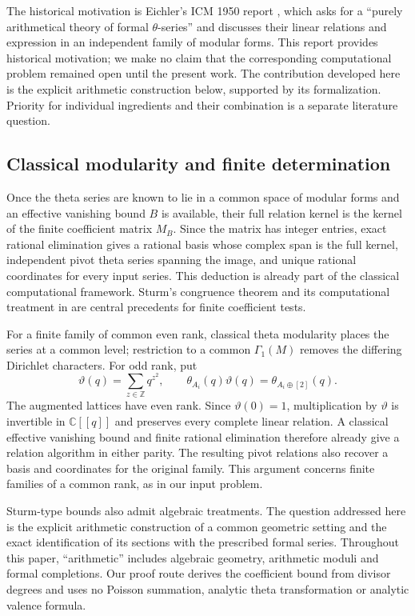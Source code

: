 \documentclass[11pt]{article}
\theoremstyle{remark}\newtheorem{remark}[theorem]{Remark}
\newcommand{\Z}{\mathbb Z}\newcommand{\Q}{\mathbb Q}
\newcommand{\C}{\mathbb C}\newcommand{\OO}{\mathcal O}
\begin{document}
The historical motivation is Eichler's ICM 1950 report
\cite[p.~70]{eichler}, which asks for a ``purely arithmetical theory of formal
$\theta$-series'' and discusses their linear relations and expression in an
independent family of modular forms. This report provides historical
motivation; we make no claim that the corresponding computational problem
remained open until the present work. The contribution developed here is
the explicit arithmetic construction below, supported by its formalization.
Priority for individual ingredients and their combination is a separate
literature question.

\subsection{Classical modularity and finite determination}
Once the theta series are known to lie in a common space of modular forms
and an effective vanishing bound $B$ is available, their full relation kernel
is the kernel of the finite coefficient matrix $M_B$. Since the matrix has
integer entries, exact rational elimination gives a rational basis whose
complex span is the full kernel, independent pivot theta series spanning the
image, and unique rational coordinates for every input series. This deduction
is already part of the classical computational framework. Sturm's congruence
theorem \cite{sturm} and its computational treatment in
\cite[Section 9.4.1.2, Theorem 9.18]{stein} are central precedents for finite
coefficient tests.

For a finite family of common even rank, classical theta modularity places
the series at a common level; restriction to a common $\Gamma_1(M)$ removes
the differing Dirichlet characters. For odd rank, put
\[
 \vartheta(q)=\sum_{z\in\Z}q^{z^2},\qquad
 \theta_{A_i}(q)\vartheta(q)=\theta_{A_i\oplus[2]}(q).
\]
The augmented lattices have even rank. Since $\vartheta(0)=1$, multiplication
by $\vartheta$ is invertible in $\C[[q]]$ and preserves every complete linear
relation. A classical effective vanishing bound and finite rational
elimination therefore already give a relation algorithm in either parity.
The resulting pivot relations also recover a basis and coordinates for
the original family. This argument concerns finite families of a common
rank, as in our input problem.

Sturm-type bounds also admit algebraic treatments. The question addressed
here is the explicit arithmetic construction of a common geometric setting
and the exact identification of its sections with the prescribed formal
series. Throughout this paper, ``arithmetic'' includes algebraic geometry,
arithmetic moduli and formal completions. Our proof route derives the
coefficient bound from divisor degrees and uses no Poisson summation,
analytic theta transformation or analytic valence formula.
\end{document}
